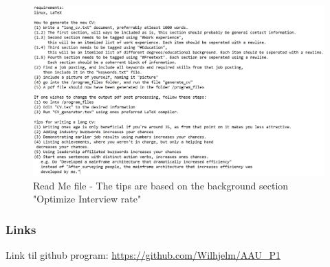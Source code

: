 \begin{figure}[H]
      \centering
      \includegraphics[scale = 0.7]{figures/readme.png}
      \caption{Read Me file - The tips are based on the background section "Optimize Interview rate"}
\end{figure}


\subsubsection*{Links}
Link til github program: \url{https://github.com/Wilhjelm/AAU_P1}
